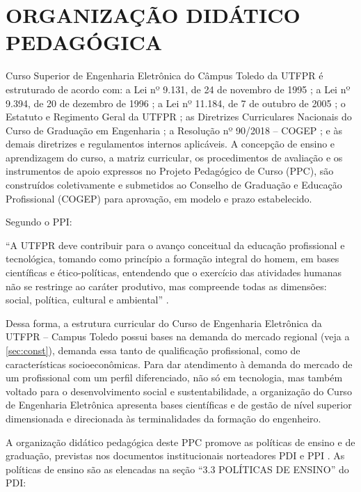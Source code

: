 \chapter{ORGANIZAÇÃO DIDÁTICO PEDAGÓGICA}
\label{chap:matriz}

Curso Superior de Engenharia Eletrônica do Câmpus Toledo da UTFPR  é estruturado de acordo com: a Lei nº 9.131, de 24 de novembro de 1995 \cite{Lei:9131:1995}; a Lei nº 9.394, de 20 de dezembro de 1996 \cite{Lei:9394:1996}; a Lei nº 11.184, de 7 de outubro de 2005 \cite{Lei:11.184:2005}; o Estatuto e Regimento Geral da UTFPR \cite{estatutoutfpr}; as Diretrizes Curriculares Nacionais do Curso de Graduação em Engenharia \cite{dcneng}; a Resolução nº 90/2018 – COGEP \cite{cogep90}; e às demais diretrizes e regulamentos internos aplicáveis. A concepção de ensino e aprendizagem do curso, a matriz curricular, os procedimentos de avaliação e os instrumentos de apoio expressos no Projeto Pedagógico de Curso (PPC), são construídos coletivamente e submetidos ao Conselho de Graduação e Educação Profissional (COGEP) para aprovação, em modelo e prazo estabelecido.

Segundo o PPI:

\begin{citacao}
	``A  UTFPR  deve  contribuir  para  o  avanço  conceitual  da educação profissional e tecnológica, tomando como princípio a formação integral do homem,  em  bases  científicas  e  ético-políticas,  entendendo  que  o  exercício  das atividades humanas não se restringe ao caráter produtivo, mas compreende todas as dimensões: social, política, cultural e ambiental'' \cite{ppiutfpr}.
\end{citacao}

Dessa forma, a estrutura curricular do Curso de Engenharia Eletrônica da UTFPR – Campus Toledo possui bases na demanda do mercado regional (veja a \autoref{sec:const}), demanda essa tanto de qualificação profissional, como de características socioeconômicas. Para dar atendimento à demanda do mercado de um profissional com um perfil diferenciado, não só em tecnologia, mas também voltado para o desenvolvimento social e sustentabilidade, a organização do Curso de Engenharia Eletrônica apresenta bases científicas e de gestão de nível superior dimensionada e direcionada às terminalidades da formação do engenheiro.

A organização didático pedagógica deste PPC promove as políticas de ensino e de graduação, previstas nos documentos institucionais norteadores PDI \cite{pdiutfpr} e PPI \cite{ppiutfpr}. As políticas de ensino são as elencadas na seção ``3.3 POLÍTICAS DE ENSINO'' do PDI:

